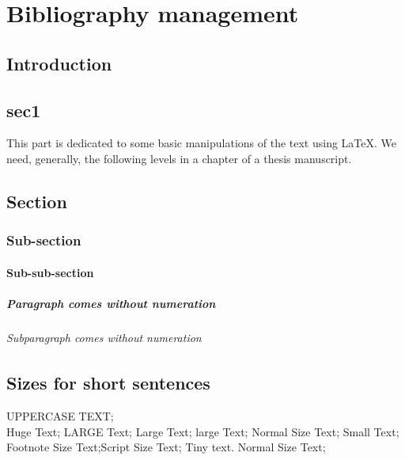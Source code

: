 \chapter{Bibliography management}
\pagestyle{fancy}
\pagestyle{fancy}\chead{} \pagestyle{fancy}\rhead{}
\pagestyle{fancy} 
\pagestyle{fancy}\cfoot{} \pagestyle{fancy}\rfoot{\thepage}
\section{Introduction}\label{start5}
\section{sec1}
This part is dedicated to some basic manipulations of the text using \LaTeX. We need, generally, the following levels in a chapter of a thesis manuscript.
\section{Section}
\subsection{Sub-section}
\subsubsection{Sub-sub-section}
\paragraph{Paragraph comes without numeration}
\subparagraph{Subparagraph comes without numeration }

\section{Sizes for short sentences }
\uppercase{uppercase text};\\
\Huge{Huge Text}; \LARGE{LARGE Text}; \Large{Large Text}; \large{large Text}; \normalsize{Normal Size Text}; \small{Small Text}; \footnotesize{Footnote Size Text};\scriptsize{Script Size Text}; \tiny{Tiny text}.
\normalsize{Normal Size Text}; 
